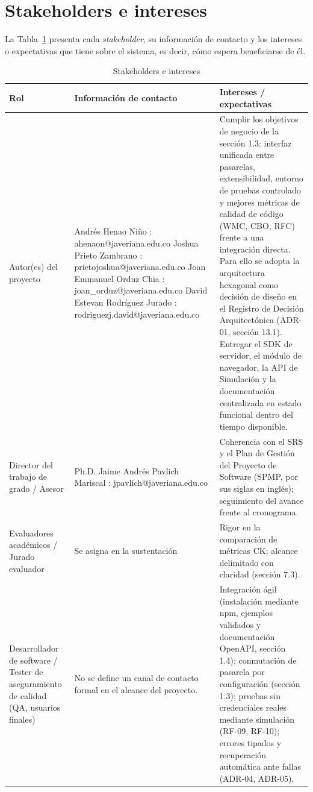 \section{Stakeholders e intereses}
La Tabla~\ref{tab:stakeholders} presenta cada \textit{stakeholder}, su información de contacto y los intereses o expectativas que tiene sobre el sistema, es decir, cómo espera beneficiarse de él.

\begin{table}[htbp]
\centering
\caption{Stakeholders e intereses}
\label{tab:stakeholders}
\renewcommand{\arraystretch}{1.3}
\begin{tabularx}{\textwidth}{|>{\raggedright\arraybackslash}p{3cm}|>{\raggedright\arraybackslash}p{5.5cm}|X|}
\hline
\textbf{Rol} & \textbf{Información de contacto} & \textbf{Intereses / expectativas} \\ \hline
Autor(es) del proyecto & Andrés Henao Niño : ahenaon@javeriana.edu.co \newline Joshua Prieto Zambrano : prietojoshua@javeriana.edu.co \newline Joan Emmanuel Orduz Chia : joan\_orduz@javeriana.edu.co \newline David Estevan Rodríguez Jurado : rodriguezj.david@javeriana.edu.co & Cumplir los objetivos de negocio de la sección 1.3: interfaz unificada entre pasarelas, extensibilidad, entorno de pruebas controlado y mejores métricas de calidad de código (WMC, CBO, RFC) frente a una integración directa. Para ello se adopta la arquitectura hexagonal como decisión de diseño en el Registro de Decisión Arquitectónica (ADR-01, sección 13.1). Entregar el SDK de servidor, el módulo de navegador, la API de Simulación y la documentación centralizada en estado funcional dentro del tiempo disponible. \\ \hline
Director del trabajo de grado / Asesor & Ph.D. Jaime Andrés Pavlich Mariscal : jpavlich@javeriana.edu.co & Coherencia con el SRS y el Plan de Gestión del Proyecto de Software (SPMP, por sus siglas en inglés); seguimiento del avance frente al cronograma. \\ \hline
Evaluadores académicos / Jurado evaluador & Se asigna en la sustentación & Rigor en la comparación de métricas CK; alcance delimitado con claridad (sección 7.3). \\ \hline
Desarrollador de software / Tester de aseguramiento de calidad (QA, usuarios finales) & No se define un canal de contacto formal en el alcance del proyecto. & Integración ágil (instalación mediante npm, ejemplos validados y documentación OpenAPI, sección 1.4); conmutación de pasarela por configuración (sección 1.3); pruebas sin credenciales reales mediante simulación (RF-09, RF-10); errores tipados y recuperación automática ante fallas (ADR-04, ADR-05). \\ \hline
\end{tabularx}
\end{table}

